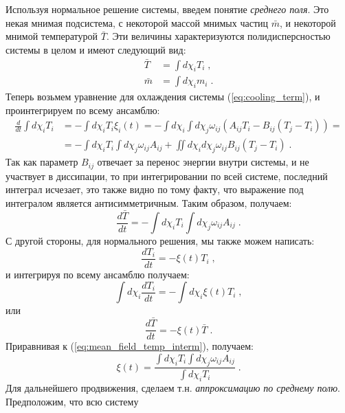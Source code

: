 Используя нормальное решение системы, введем понятие \emph{среднего поля}. Это некая мнимая подсистема, с некоторой массой 
мнимых частиц $\bar{m}$, и некоторой мнимой температурой $\bar{T}$. Эти величины характеризуются полидисперсностью системы в целом
и имеют следующий вид:
\begin{equation}
  \begin{split}
    \bar{T} &= \int d\chi_iT_i\;,\\
    \bar{m} &= \int d\chi_im_i\;.
  \end{split}
\end{equation}
Теперь возьмем уравнение для охлаждения системы (\ref{eq:cooling_term}), и проинтегрируем по всему ансамблю:
\begin{equation}
  \begin{split}
    \frac{d}{dt}\int d\chi_iT_i &= -\int d\chi_iT_i\xi_i(t) = -\int d\chi_i\int d\chi_j\omega_{ij}(A_{ij}T_i-B_{ij}(T_j-T_i))=\\
    &=-\int d\chi_iT_i\int d\chi_j\omega_{ij}A_{ij}+\iint d\chi_id\chi_j\omega_{ij}B_{ij}(T_j-T_i)\;.
  \end{split}
\end{equation}
Так как параметр $B_{ij}$ отвечает за перенос энергии внутри системы, и не участвует в диссипации, то при интегрировании по
всей системе, последний интеграл исчезает, это также видно по тому факту, что выражение под интегралом является антисимметричным.
Таким образом, получаем:
\begin{equation}\label{eq:mean_field_temp_interm}
  \frac{d\bar{T}}{dt}=-\int d\chi_iT_i\int d\chi_j\omega_{ij}A_{ij}\;.
\end{equation}
С другой стороны, для нормального решения, мы также можем написать:
\begin{equation}
  \frac{dT_i}{dt}=-\xi(t)T_i\;,
\end{equation}
и интегрируя по всему ансамблю получаем:
\begin{equation}
  \int d\chi_i\frac{dT_i}{dt}=-\int d\chi_i\xi(t)T_i\;,
\end{equation}
или
\begin{equation}
  \frac{d\bar{T}}{dt}=-\xi(t)\bar{T}\;.
\end{equation}
Приравнивая к (\ref{eq:mean_field_temp_interm}), получаем:
\begin{equation}
  \xi(t) = \frac{\int d\chi_iT_i\int d\chi_j\omega_{ij}A_{ij}}{\int d\chi_iT_i}\;.
\end{equation}
Для дальнейшего продвижения, сделаем т.н. \emph{аппроксимацию по среднему полю}. Предположим, что всю систему 
